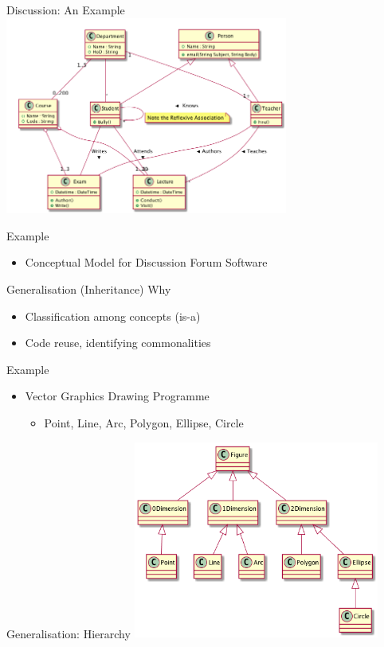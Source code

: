 \documentclass[10pt,t,a4paper]{beamer}
\begin{document}
\begin{frame}[label=sec-1-11]{Discussion: An Example}
\includegraphics[height=6.5cm]{FExampleUniversity.png}
\end{frame}
\begin{frame}[label=sec-1-12]{Example}
\begin{itemize}
\item Conceptual Model for Discussion Forum Software
\end{itemize}
\end{frame}
\begin{frame}[label=sec-1-13]{Generalisation (Inheritance)}
Why
\begin{itemize}
\item Classification among concepts (is-a)
\item Code reuse, identifying commonalities
\end{itemize}

Example
\begin{itemize}
\item Vector Graphics Drawing Programme
\begin{itemize}
\item Point, Line, Arc, Polygon, Ellipse, Circle
\end{itemize}
\end{itemize}
\end{frame}
\begin{frame}[label=sec-1-14]{Generalisation: Hierarchy}
\includegraphics[height=6.5cm]{FInheritance.png}
\end{frame}
\end{document}

